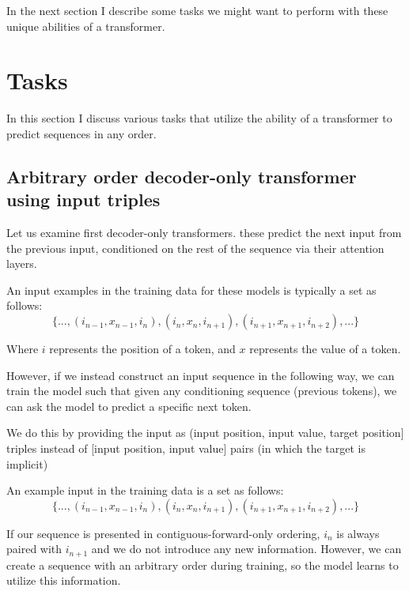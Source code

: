 In the next section I describe some tasks we might want to perform with these unique abilities of a transformer.

\section{Tasks}
\label{s:order-tasks}

In this section I discuss various tasks that utilize the ability of a transformer to predict sequences in any order.

\subsection{Arbitrary order decoder-only transformer using input triples}
\label{ss:decoder-only-triples}

Let us examine first decoder-only transformers. these predict the next input from the previous input, conditioned on the rest of the sequence via their attention layers.

An input examples in the training data for these models is typically a set as follows:
$$
   \{ ..., (i_{n-1}, x_{n-1}, i_{n}), (i_{n}, x_{n}, i_{n+1}), (i_{n+1}, x_{n+1}, i_{n+2}), ... \}
$$

Where $i$ represents the position of a token, and $x$ represents the value of a token.

However, if we instead construct an input sequence in the following way, we can train the model such that given any conditioning sequence (previous tokens), we can ask the model to predict a specific next token.

We do this by providing the input as (input position, input value, target position] triples instead of [input position, input value] pairs (in which the target is implicit)



An example input in the training data is a set as follows:
$$
   \{ ..., (i_{n-1}, x_{n-1}, i_{n}), (i_{n}, x_{n}, i_{n+1}), (i_{n+1}, x_{n+1}, i_{n+2}), ... \}
$$


If our sequence is presented in contiguous-forward-only ordering, $i_n$ is always paired with $i_{n+1}$ and we do not introduce any new information. However, we can create a sequence with an arbitrary order during training, so the model learns to utilize this information.

